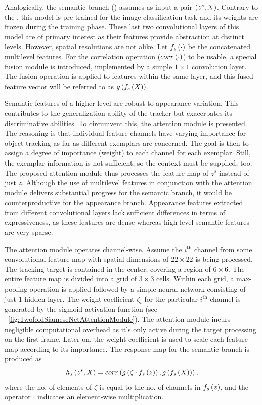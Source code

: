 Analogically, the semantic branch (\snet{}) assumes as input a pair $\left( {z^s, X} \right)$. Contrary to the \anet{}, this model is pre-trained for the image classification task and its weights are frozen during the training phase. These last two convolutional layers of this model are of primary interest as their features provide abstraction at distinct levels. However, spatial resolutions are not alike. Let ${f_s} \left( \cdot \right)$ be the concatenated multilevel features. For the correlation operation (${corr} \left( \cdot \right)$) to be usable, a special fusion module is introduced, implemented by a simple $1 \times 1$ convolution layer. The fusion operation is applied to features within the same layer, and this fused feature vector will be referred to as ${g} \left( {f_s} \left( X \right) \right)$.

Semantic features of a higher level are robust to appearance variation. This contributes to the generalization ability of the tracker but exacerbates its discriminative abilities. To circumvent this, the attention module is presented. The reasoning is that individual feature channels have varying importance for object tracking as far as different exemplars are concerned. The goal is then to assign a degree of importance (weight) to each channel for each exemplar. Still, the exemplar information is not sufficient, so the context must be supplied, too. The proposed attention module thus processes the feature map of $z^s$ instead of just $z$. Although the use of multilevel features in conjunction with the attention module delivers substantial progress for the semantic branch, it would be counterproductive for the appearance branch. Appearance features extracted from different convolutional layers lack sufficient differences in terms of expressiveness, as these features are dense whereas high-level semantic features are very sparse.

The attention module operates channel-wise. Assume the $i^{\text{th}}$ channel from some convolutional feature map with spatial dimensions of $22 \times 22$ is being processed. The tracking target is contained in the center, covering a region of $6 \times 6$. The entire feature map is divided into a grid of $3 \times 3$ cells. Within each grid, a max-pooling operation is applied followed by a simple neural network consisting of just $1$ hidden layer. The weight coefficient $\zeta_i$ for the particular $i^{\text{th}}$ channel is generated by the sigmoid activation function (see \figstr{}~\ref{fig:TwofoldSiameseNetAttentionModule}). The attention module incurs negligible computational overhead as it's only active during the target processing on the first frame. Later on, the weight coefficient is used to scale each feature map according to its importance. The response map for the semantic branch is produced as
\begin{equation}
    {h_s} \left( z^s, X \right) =
    {corr} \left( 
        {g} \left( \zeta \cdot {f_s} \left( z \right) \right),
        {g} \left( {f_s} \left( X \right) \right)
     \right),
\end{equation}
where the no. of elements of $\zeta$ is equal to the no. of channels in ${f_s} \left( z \right)$, and the operator $\cdot$ indicates an element-wise multiplication.

